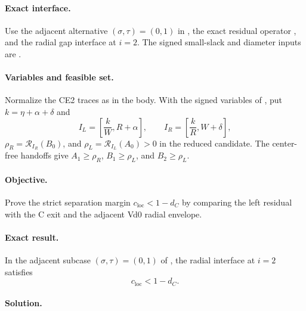 \paragraph{Exact interface.}
Use the adjacent alternative $(\sigma,\tau)=(0,1)$ in
, the exact residual operator
, and the radial gap interface
 at $i=2$.  The signed small-slack and
diameter inputs are .

\paragraph{Variables and feasible set.}
Normalize the CE2 traces as in the body.  With the signed variables of
, put
$k=\eta+\alpha+\delta$ and
\[
 I_L=\left[\frac{k}{W},R+\alpha\right],
 \qquad I_R=\left[\frac{k}{R},W+\delta\right],
\]
$\rho_R=\mathcal R_{I_R}(B_0)$, and
$\rho_L=\mathcal R_{I_L}(A_0)>0$ in the reduced candidate.  The center-free handoffs give
$A_1\ge\rho_R$, $B_1\ge\rho_L$, and $B_2\ge\rho_L$.

\paragraph{Objective.}
Prove the strict separation margin $c_{\mathrm{loc}}<1-d_C$ by comparing the
left residual with the C exit and the adjacent Vd0 radial envelope.

\paragraph{Exact result.}

\begin{lemma}
\label{lem:app-adjacent-vd-separation}
In the adjacent subcase $(\sigma,\tau)=(0,1)$ of
, the radial interface at $i=2$
satisfies
\[
 c_{\mathrm{loc}}<1-d_C.
\]
\end{lemma}

\paragraph{Solution.}

